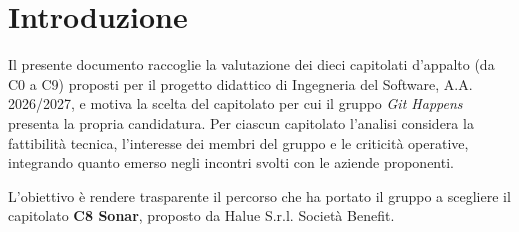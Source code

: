 \section{Introduzione}

Il presente documento raccoglie la valutazione dei dieci capitolati d'appalto (da C0 a C9) proposti per il progetto didattico di Ingegneria del Software, A.A. 2026/2027, e motiva la scelta del capitolato per cui il gruppo \emph{Git Happens} presenta la propria candidatura. Per ciascun capitolato l'analisi considera la fattibilità tecnica, l'interesse dei membri del gruppo e le criticità operative, integrando quanto emerso negli incontri svolti con le aziende proponenti.

L'obiettivo è rendere trasparente il percorso che ha portato il gruppo a scegliere il capitolato \textbf{C8 Sonar}, proposto da Halue S.r.l. Società Benefit.
